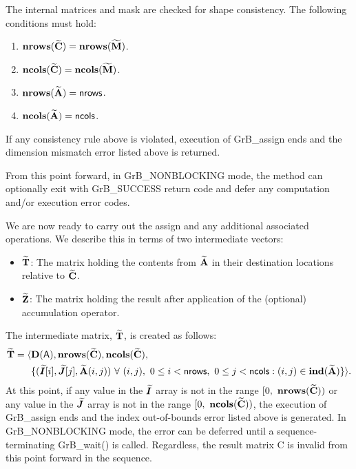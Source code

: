 The internal matrices and mask are checked for shape consistency. The following 
conditions must hold:
\begin{enumerate}
    \item $\bold{nrows}({\bf \widetilde{C}}) = \bold{nrows}({\bf \widetilde{M}})$.

    \item $\bold{ncols}({\bf \widetilde{C}}) = \bold{ncols}({\bf \widetilde{M}})$.

    \item $\bold{nrows}({\bf \widetilde{A}}) = {\sf nrows}$.

    \item $\bold{ncols}({\bf \widetilde{A}}) = {\sf ncols}$.
\end{enumerate}
If any consistency rule above is violated, execution of {\sf GrB\_assign} ends and 
the dimension mismatch error listed above is returned.

From this point forward, in {\sf GrB\_NONBLOCKING} mode, the method can 
optionally exit with {\sf GrB\_SUCCESS} return code and defer any computation 
and/or execution error codes.

We are now ready to carry out the assign and any additional 
associated operations.  We describe this in terms of two intermediate vectors:
\begin{itemize}
	\item ${\bf \widetilde{T}}$: The matrix holding the contents from
    ${\bf \widetilde{A}}$ in their destination locations relative to
    ${\bf \widetilde{C}}$.

	\item ${\bf \widetilde{Z}}$: The matrix holding the result after 
    application of the (optional) accumulation operator.
\end{itemize}

The intermediate matrix, ${\bf \widetilde{T}}$, is created as follows:
\[ 
\begin{aligned}
{\bf \widetilde{T}} = \langle & \bold{D}({\sf A}), 
                           \bold{nrows}({\bf \widetilde{C}}), 
                           \bold{ncols}({\bf \widetilde{C}}), \\
 & \{ (\bm{\widetilde{I}}[i],\bm{\widetilde{J}}[j],{\bf \widetilde{A}}(i,j)) 
\ \forall \ (i,j), \ 0 \leq i < {\sf nrows}, \ 0 \leq j < {\sf ncols} :
(i,j) \in \bold{ind}({\bf \widetilde{A}}) \} \rangle. 
\end{aligned}
\]
At this point, if any value in the $\bm{\widetilde{I}}$ array is not in
the range $[0,\ \bold{nrows}(\matrix{\widetilde{C}}) )$ or any value in the 
$\bm{\widetilde{J}}$ array is not in the range 
$[0,\ \bold{ncols}(\matrix{\widetilde{C}}))$, the execution of {\sf GrB\_assign} 
ends and the index out-of-bounds error listed above is generated.  In 
{\sf GrB\_NONBLOCKING} mode, the error can be deferred until a 
sequence-terminating {\sf GrB\_wait()} is called.  Regardless, the result 
matrix {\sf C} is invalid from this point forward in the sequence.

